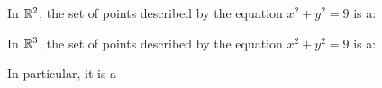 \documentclass{ximera}
\author{Bart Snapp}
\begin{document}
\begin{exercise}
  In $\mathbb R^2$, the set of points described by the equation
  $x^2+y^2=9$ is a:
  \begin{multipleChoice}
  \end{multipleChoice}
  \begin{exercise}
  In $\mathbb R^3$, the set of points described by the equation $x^2+y^2=9$
  is a:
  \begin{multipleChoice}
  \end{multipleChoice}
  \begin{exercise}
    In particular, it is a
    \begin{multipleChoice}
    \end{multipleChoice}
  \end{exercise}
\end{exercise}
\end{exercise}
\end{document}
